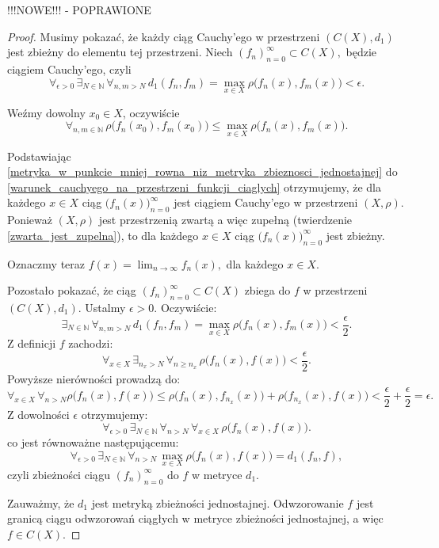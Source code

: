 \documentclass[licencjacka]{pwr_wmat_praca_dyplomowa}
\theoremstyle{plain}
\numberwithin{theorem}{chapter}
\theoremstyle{definition}
\numberwithin{theorem}{chapter}
\begin{document}
{\color{red} !!!NOWE!!! - POPRAWIONE
\begin{proof}
Musimy pokazać, że każdy ciąg Cauchy'ego w przestrzeni $(C(X), d_1)$ jest zbieżny do elementu tej przestrzeni.
Niech $(f_n)_{n=0}^{\infty} \subset C(X),$ będzie ciągiem Cauchy'ego, czyli 
\begin{equation}
\label{warunek_cauchyego_na_przestrzeni_funkcji_ciaglych}
\forall_{\epsilon > 0} \, \exists_{N \in \mathbb{N}} \, \forall_{n,m > N} \, d_1(f_n, f_m) = \max_{x \in X} \rho\big(f_n(x), f_m(x)\big) < \epsilon.
\end{equation}

Weźmy dowolny $x_0 \in X$, oczywiście 
\begin{equation}
\label{metryka_w_punkcie_mniej_rowna_niz_metryka_zbieznosci_jednostajnej}
\forall_{n,m \in \mathbb{N}} \, \rho\big(f_n(x_0), f_m(x_0)\big) \leq \max_{x \in X} \rho\big(f_n(x), f_m(x)\big).
\end{equation}

Podstawiając \ref{metryka_w_punkcie_mniej_rowna_niz_metryka_zbieznosci_jednostajnej} do \ref{warunek_cauchyego_na_przestrzeni_funkcji_ciaglych} otrzymujemy, że dla każdego $x \in X$ ciąg $\big(f_n(x)\big)_{n=0}^{\infty}$ jest ciągiem Cauchy'ego w przestrzeni $(X, \rho).$ Ponieważ $(X, \rho)$ jest przestrzenią zwartą a więc zupełną (twierdzenie \ref{zwarta_jest_zupelna}), to dla każdego $x \in X$ ciąg $\big(f_n(x)\big)_{n=0}^{\infty}$ jest zbieżny.

Oznaczmy teraz $f(x) = \lim_{n \rightarrow \infty} f_n(x),$ dla każdego $x \in X.$ 


Pozostało pokazać, że ciąg $(f_n)_{n=0}^{\infty} \subset C(X)$ zbiega do $f$ w przestrzeni $(C(X), d_1).$ 
Ustalmy $\epsilon > 0.$ Oczywiście:
$$\exists_{N \in \mathbb{N}} \, \forall_{n,m > N} \, d_1(f_n, f_m) = \max_{x \in X} \rho\big(f_n(x), f_m(x)\big) < \frac{\epsilon}{2}.$$
Z definicji $f$ zachodzi: 
$$\forall_{x \in X} \, \exists_{n_x > N} \, \forall_{n \geq n_x} \, \rho\big(f_{n}(x), f(x)\big) < \frac{\epsilon}{2}.$$
Powyższe nierówności prowadzą do:
$$\forall_{x \in X} \, \forall_{n > N} \rho\big(f_n(x), f(x)\big) \leq \rho\big(f_n(x), f_{n_x}(x)\big) + \rho\big(f_{n_x}(x), f(x)\big) < \frac{\epsilon}{2} + \frac{\epsilon}{2} = \epsilon.$$
Z dowolności $\epsilon$ otrzymujemy:
$$\forall_{\epsilon > 0} \, \exists_{N \in \mathbb{N}} \, \forall_{n > N} \, \forall_{x \in X} \, \rho\big(f_n(x), f(x)\big).$$ 
co jest równoważne następującemu:
$$\forall_{\epsilon > 0} \, \exists_{N \in \mathbb{N}} \, \forall_{n > N} \, \max_{x \in X} \rho\big(f_n(x), f(x)\big) = d_1(f_n, f),$$ 
czyli zbieżności ciągu $(f_n)_{n=0}^{\infty}$ do $f$ w metryce $d_1.$


Zauważmy, że $d_1$ jest metryką zbieżności jednostajnej. Odwzorowanie $f$ jest granicą ciągu odwzorowań ciągłych w metryce zbieżności jednostajnej, a więc $f \in C(X).$
\end{proof}
}
\end{document}
